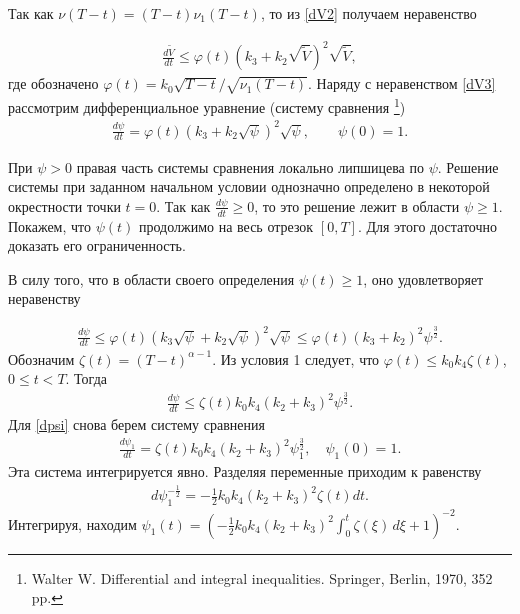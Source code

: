 \documentclass[../main.tex]{subfiles}
\begin{document}
	
	
	Так как $\nu (T - t) = (T - t) \nu_1 (T - t)$,
	то из \eqref{dV2} получаем неравенство
	
	\begin{gather}\label{dV3}
			\frac{d\widetilde{V}}{dt} \leqslant \varphi(t) \left(k_3 + k_2\sqrt{\widetilde{V}}\right)^2 \sqrt{\widetilde{V}},
	\end{gather}
	где  обозначено $\varphi (t) = k_0 \sqrt{T - t} / \sqrt{\nu_1 (T - t)}.$
	Наряду с неравенством \eqref{dV3} рассмотрим  дифференциальное уравнение (систему сравнения \footnote{Walter W. Differential and integral inequalities. Springer, Berlin, 1970, 352 pp.})
	\begin{gather*}
			\frac{d\psi}{dt} = \varphi (t) \left(k_3 + k_2\sqrt{\psi}\right)^2 \sqrt{\psi}, \qquad \psi (0) = 1.
	\end{gather*}
	
	При $\psi>0$ правая часть системы сравнения локально липшицева по $\psi$. Решение системы при заданном начальном условии однозначно определено  в некоторой окрестности точки $t=0$.  
	 Так как $\frac{d\psi}{dt} \geqslant 0$, то это решение лежит в области $\psi\geqslant1$. Покажем, что $\psi(t)$ продолжимо на весь отрезок $[0,T]$. Для этого достаточно доказать его ограниченность.   
	 
	 В силу того, что   в области своего определения $\psi(t)\geqslant1$, оно удовлетворяет неравенству 
	
	\begin{gather*}
			\frac{d\psi}{dt} \leqslant \varphi (t) \left(k_3 \sqrt{\psi} + k_2\sqrt{\psi}\right)^2 \sqrt{\psi} \leqslant \varphi(t) (k_3 + k_2)^2 \psi^\frac{3}{2}.
	\end{gather*}
	Обозначим $  \zeta (t) = {(T - t)^{\alpha-1}}$.
	 Из условия 1 следует, что  $\varphi(t) \leqslant k_0k_4\zeta (t)$, $0 \leqslant t<T$. Тогда 
	\begin{gather}\label{dpsi}
			\frac{d\psi}{dt} \leqslant  \zeta(t) k_0k_4(k_2 + k_3)^2 \psi^\frac{3}{2}.
	\end{gather}
	Для \eqref{dpsi} снова берем систему сравнения 
	\begin{gather*}
			\frac{d\psi_1}{dt} = \zeta (t) k_0k_4 (k_2 + k_3)^2 \psi_1^\frac{3}{2}, \quad \psi_1(0)=1.
	\end{gather*}
	Эта система интегрируется явно.
	Разделяя переменные приходим к равенству
	\begin{gather*}
			d\psi_1^{- \frac{1}{2}} = - \frac{1}{2} k_0 k_4 (k_2 + k_3)^2 \zeta (t) dt.
	\end{gather*}
	Интегрируя, находим $\psi_1(t) =  \left(-\frac{1}{2} k_0 k_4 (k_2 + k_3)^2 \displaystyle{\int^t_{0}} \zeta (\xi) \, d\xi +1\right)^{-2}. $
	
\end{document}
